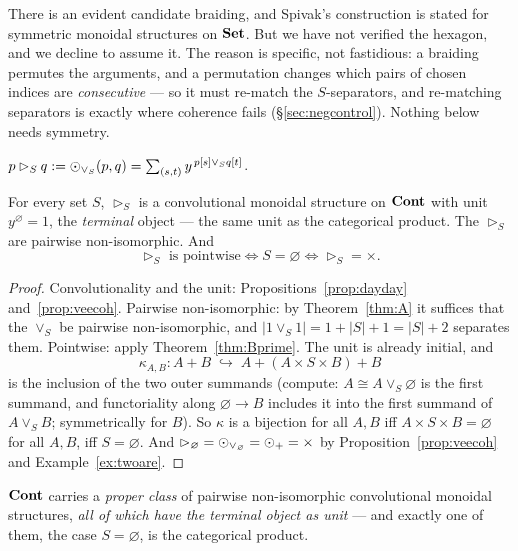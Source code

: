\begin{Remark}\label{rem:nosymm}
There is an evident candidate braiding, and Spivak's construction is stated for
symmetric monoidal structures on $\mathbf{Set}$. But we have not verified the hexagon,
and we decline to assume it. The reason is specific, not fastidious: a braiding
permutes the arguments, and a permutation changes which pairs of chosen indices
are \emph{consecutive} --- so it must re-match the $S$-separators, and re-matching
separators is exactly where coherence fails (§\ref{sec:negcontrol}). Nothing
below needs symmetry.
\end{Remark}

\begin{Definition}\label{def:triS}
$p\rhd_S q:=\mathbin{\odot}_{\vee_S}(p,q)=\sum_{(s,t)} y^{\,p[s]\vee_S q[t]}$.
\end{Definition}

\begin{Theorem}\label{thm:blind}
For every set $S$, $\rhd_S$ is a convolutional monoidal structure on $\mathbf{Cont}$
with unit $y^{\varnothing}=1$, the \emph{terminal} object --- the same unit as the
categorical product. The $\rhd_S$ are pairwise non-isomorphic. And
\[
   \rhd_S \text{ is pointwise}\iff S=\varnothing\iff \rhd_S=\times .
\]
\end{Theorem}

\begin{proof}
Convolutionality and the unit: Propositions~\ref{prop:dayday}
and~\ref{prop:veecoh}. Pairwise non-isomorphic: by Theorem~\ref{thm:A} it
suffices that the $\vee_S$ be pairwise non-isomorphic, and
$|1\vee_S 1|=1+|S|+1=|S|+2$ separates them. Pointwise: apply
Theorem~\ref{thm:Bprime}. The unit is already initial, and
\[
   \kappa_{A,B}\colon A+B\;\hookrightarrow\; A+(A\times S\times B)+B
\]
is the inclusion of the two outer summands (compute: $A\cong A\vee_S\varnothing$
is the first summand, and functoriality along $\varnothing\to B$ includes it into
the first summand of $A\vee_S B$; symmetrically for $B$). So $\kappa$ is a
bijection for all $A,B$ iff $A\times S\times B=\varnothing$ for all $A,B$, iff
$S=\varnothing$. And $\rhd_{\varnothing}=\mathbin{\odot}_{\vee_\varnothing}=\mathbin{\odot}_{+}=\times$
by Proposition~\ref{prop:veecoh} and Example~\ref{ex:twoare}.
\end{proof}

\begin{Corollary}\label{cor:sharp}
$\mathbf{Cont}$ carries a \emph{proper class} of pairwise non-isomorphic convolutional
monoidal structures, \emph{all of which have the terminal object as unit} --- and
exactly one of them, the case $S=\varnothing$, is the categorical product.
\end{Corollary}


